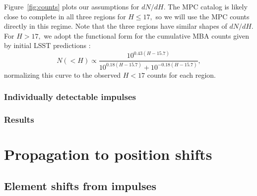\documentclass[linenumbers, onecolumn]{aastex631}
\begin{document}
Figure~\ref{fig:counts} plots our assumptions for $dN/dH.$  The MPC
catalog is likely close to complete in all three regions for $H\le17,$
so we will use the MPC counts directly in this regime.  Note that the
three regions have similar shapes of $dN/dH.$  For $H>17,$ we adopt
the functional form for the cumulative MBA counts given by
initial LSST predictions \citep{LSST_science_book}:
\begin{equation}
  N(<H) \propto \frac{10^{0.43(H-15.7)}}{10^{0.18(H-15.7)} +
    10^{-0.18(H-15.7)}},
\label{eq:lsstmba}
\end{equation}
normalizing this curve to the observed $H<17$ counts for each region.

\subsubsection{Individually detectable impulses}

\subsubsection{Results}


\section{Propagation to position shifts}
\label{sec:propagation}

\subsection{Element shifts from impulses}
\label{sec:elements}
\end{document}
